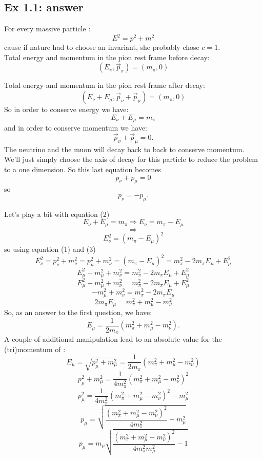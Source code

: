 \documentclass[a4paper]{article}
\begin{document}
\subsection{Ex 1.1: answer}
For every massive particle :
\begin{equation} E^2 =  p^2 + m^2 \end{equation} 
cause if nature had to choose an invariant, she probably chose $c=1$.\\

Total energy and momentum in the pion rest frame before decay:
$$ (E_{\pi},  \vec{p}_{\pi}) = (m_{\pi}, 0)  $$

Total energy and momentum in the pion rest frame after decay:
$$ (E_{\nu}+E_{\mu}, \vec{p}_{\nu}+\vec{p}_{\mu}) = (m_{\pi}, 0)  $$
So in order to conserve energy we have:
\begin{equation} E_{\nu}+E_{\mu} = m_{\pi} \end{equation} 
and in order to conserve momentum we have:
$$ \vec{p}_{\nu}+\vec{p}_{\mu} = 0 .$$
The neutrino and the muon will decay back to back to conserve momentum. We'll just simply choose the axis of decay for this particle to reduce the problem to a one dimension.
So this last equation becomes 
$$ p_{\nu}+p_{\mu} = 0 $$ so
\begin{equation} p_{\nu} = -p_{\mu}  .\end{equation} 

Let's play a bit with equation (2)
$$ E_{\nu}+E_{\mu} = m_{\pi} \Rightarrow E_{\nu} = m_{\pi} - E_{\mu}$$ 
$$\Rightarrow$$ 
$$E^2_{\nu} = (m_{\pi} - E_{\mu})^2 $$ 
so using equation (1) and (3)
\begin{equation} E^2_{\nu} = p^2_{\nu} + m^2_{\nu} = p^2_{\mu} + m^2_{\nu}  = (m_{\pi} - E_{\mu})^2 = m^2_{\pi} - 2m_{\pi}E_{\mu} + E^2_{\mu}  \end{equation} 
$$E^2_{\mu} - m^2_{\mu} + m^2_{\nu}  = m^2_{\pi} - 2m_{\pi}E_{\mu} + E^2_{\mu}  $$
$$E^2_{\mu} - m^2_{\mu} + m^2_{\nu}  = m^2_{\pi} - 2m_{\pi}E_{\mu} + E^2_{\mu}  $$
$$ - m^2_{\mu} + m^2_{\nu}  = m^2_{\pi} - 2m_{\pi}E_{\mu}   $$
$$ 2m_{\pi}E_{\mu}  = m^2_{\pi} + m^2_{\mu} - m^2_{\nu} $$
So, as an answer to the first question, we have:
\begin{equation} E_{\mu}  = \frac{1}{2m_{\pi}}(m^2_{\pi} + m^2_{\mu} - m^2_{\nu}).  \end{equation} 
A couple of additional manipulation lead to an absolute value for the (tri)momentum of :
$$ E_{\mu} = \sqrt{p^2_{\mu}+m^2_{\mu}} = \frac{1}{2m_{\pi}}(m^2_{\pi} + m^2_{\mu} - m^2_{\nu}) $$
$$ p^2_{\mu}+m^2_{\mu} = \frac{1}{4m^2_{\pi}}(m^2_{\pi} + m^2_{\mu} - m^2_{\nu})^2 $$
$$ p^2_{\mu} = \frac{1}{4m^2_{\pi}}(m^2_{\pi} + m^2_{\mu} - m^2_{\nu})^2 - m^2_{\mu}$$
$$p_{\mu} = \sqrt{\frac{(m^2_{\pi} + m^2_{\mu} - m^2_{\nu})^2}{4m^2_{\pi}} - m^2_{\mu}}$$
\begin{equation} p_{\mu} = m_{\mu}\sqrt{\frac{(m^2_{\pi} + m^2_{\mu} - m^2_{\nu})^2}{4m^2_{\pi}m^2_{\mu}} - 1}\end{equation} 
\end{document}
